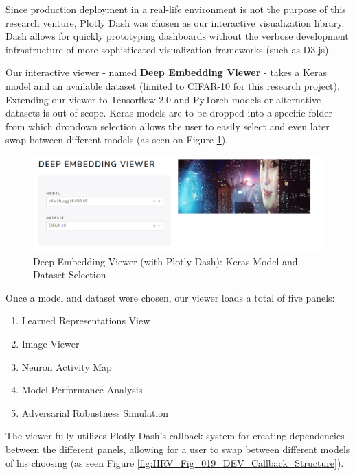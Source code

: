 Since production deployment in a real-life environment is not the purpose of this research venture, Plotly Dash was chosen as our interactive visualization library. Dash allows for quickly prototyping dashboards without the verbose development infrastructure of more sophisticated visualization frameworks (such as D3.js). 

Our interactive viewer - named \textbf{Deep Embedding Viewer} - takes a Keras model and an available dataset (limited to CIFAR-10 for this research project). Extending our viewer to Tensorflow 2.0 and PyTorch models or alternative datasets is out-of-scope. Keras models are to be dropped into a specific folder from which dropdown selection allows the user to easily select and even later swap between different models (as seen on Figure \ref{fig:HRV_011_DEV_Intro}).


\vspace{0.2cm}

\begin{figure}[H]
	\centering
	\includegraphics[scale=0.55]{images/embedding_view/HRV_Fig_011_DEV_Intro.PNG}
	\caption{Deep Embedding Viewer (with Plotly Dash): Keras Model and Dataset Selection}
	\label{fig:HRV_011_DEV_Intro}
\end{figure}

\vspace{0.2cm}

Once a model and dataset were chosen, our viewer loads a total of five panels:

\begin{enumerate}
	\item Learned Representations View
	\item Image Viewer
	\item Neuron Activity Map
	\item Model Performance Analysis
	\item Adversarial Robustness Simulation
\end{enumerate}

The viewer fully utilizes Plotly Dash's callback system for creating dependencies between the different panels, allowing for a user to swap between different models of his choosing (as seen Figure \ref{fig:HRV_Fig_019_DEV_Callback_Structure}).

